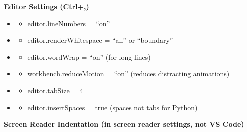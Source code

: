 \documentclass[
  justified,
  openright,
]{tufte-book}
\providecommand{\tightlist}{%
  \setlength{\itemsep}{0pt}\setlength{\parskip}{0pt}}
\begin{document}
\textbf{Editor Settings (Ctrl+,)}

\begin{itemize}
\tightlist
\item
  \begin{itemize}
  \tightlist
  \item[$\square$]
    editor.lineNumbers = ``on''
  \end{itemize}
\item
  \begin{itemize}
  \tightlist
  \item[$\square$]
    editor.renderWhitespace = ``all'' or ``boundary''
  \end{itemize}
\item
  \begin{itemize}
  \tightlist
  \item[$\square$]
    editor.wordWrap = ``on'' (for long lines)
  \end{itemize}
\item
  \begin{itemize}
  \tightlist
  \item[$\square$]
    workbench.reduceMotion = ``on'' (reduces distracting animations)
  \end{itemize}
\item
  \begin{itemize}
  \tightlist
  \item[$\square$]
    editor.tabSize = 4
  \end{itemize}
\item
  \begin{itemize}
  \tightlist
  \item[$\square$]
    editor.insertSpaces = true (spaces not tabs for Python)
  \end{itemize}
\end{itemize}

\textbf{Screen Reader Indentation (in screen reader settings, not VS
Code)}
\end{document}
